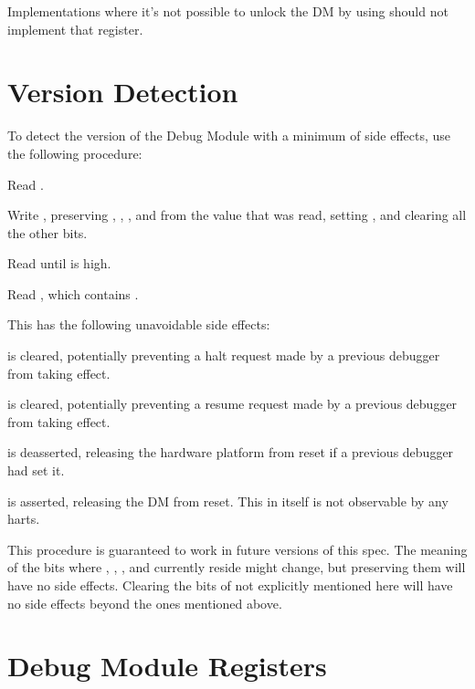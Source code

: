 Implementations where it's not possible to unlock the DM by using \RdmAuthdata
should not implement that register.

\section{Version Detection}

\begin{steps}{To detect the version of the Debug Module with a minimum of side
    effects, use the following procedure:}
    \item Read \RdmDmcontrol.
    \item Write \RdmDmcontrol, preserving \FdmDmcontrolHartreset, \FdmDmcontrolHasel, \FdmDmcontrolHartsello, and
        \FdmDmcontrolHartselhi from the value that was read, setting \FdmDmcontrolDmactive, and
        clearing all the other bits.
    \item Read \RdmDmcontrol until \FdmDmcontrolDmactive is high.
    \item Read \RdmDmstatus, which contains \FdmDmstatusVersion.
\end{steps}

\begin{steps}{This has the following unavoidable side effects:}
    \item \FdmDmcontrolHaltreq is cleared, potentially preventing a halt request made by a
        previous debugger from taking effect.
    \item \FdmDmcontrolResumereq is cleared, potentially preventing a resume request made
        by a previous debugger from taking effect.
    \item \FdmDmcontrolNdmreset is deasserted, releasing the hardware platform from reset if a
        previous debugger had set it.
    \item \FdmDmcontrolDmactive is asserted, releasing the DM from reset. This in itself
        is not observable by any harts.
\end{steps}

This procedure is guaranteed to work in future versions of this spec.  The
meaning of the \RdmDmcontrol bits where \FdmDmcontrolHartreset, \FdmDmcontrolHasel, \FdmDmcontrolHartsello, and
\FdmDmcontrolHartselhi currently reside might change, but preserving them will have no
side effects. Clearing the bits of \RdmDmcontrol not explicitly mentioned here
will have no side effects beyond the ones mentioned above.

\section{Debug Module Registers} \label{dmdebbus}

